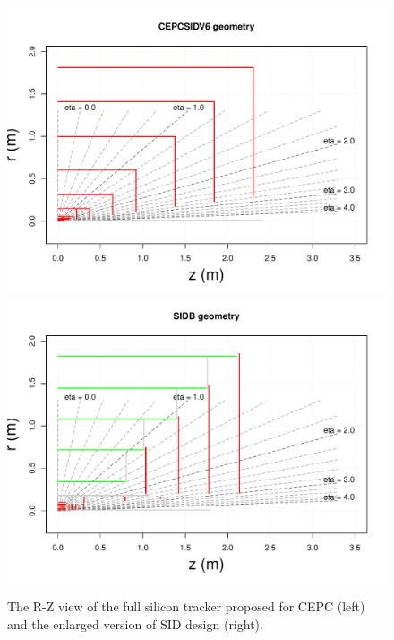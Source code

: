 \begin{figure}[hbtp]
\begin{center}
\includegraphics[width=0.32\textheight,keepaspectratio]{Figures/TrackingSystem/FullSilicon/Step1_CEPCSIDV6__geom_R.pdf}
\includegraphics[width=0.32\textheight,keepaspectratio]{Figures/TrackingSystem/FullSilicon/Step1_SIDBig__geom_R.pdf}
\caption{The R-Z view of the full silicon tracker proposed for CEPC (left) and the enlarged version of SID design (right).\label{fig:fullsigeom}}
\end{center}
\end{figure}

